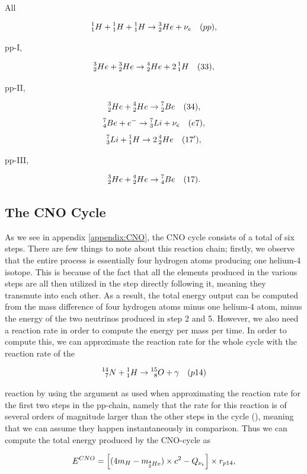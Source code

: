 \documentclass[a4paper,10pt,english]{article}
\newcommand{\Hh}{\prescript{1}{1}{H}}
\newcommand{\He}{\prescript{3}{2}{He}}
\begin{document}
All

$$\prescript{1}{1}{H} + \prescript{1}{1}{H} + \prescript{1}{1}{H} \rightarrow \prescript{3}{2}{He} + \nu_e \quad (pp),$$

pp-I,

$$\He + \He \rightarrow \prescript{4}{2}{He} + 2 \Hh \quad (33),$$

pp-II,

$$\He + \prescript{4}{2}{He} \rightarrow \prescript{7}{2}{Be} \quad (34),$$
$$\prescript{7}{4}{Be} + e^- \rightarrow \prescript{7}{3}{Li} + \nu_e \quad (e7),$$
$$\prescript{7}{3}{Li} + \Hh \rightarrow 2\prescript{4}{2}{He} \quad (17'),$$

pp-III,

$$\He + \prescript{4}{2}{He} \rightarrow \prescript{7}{4}{Be} \quad (17).$$
 
\subsection{The CNO Cycle}

As we see in appendix \ref{appendix:CNO}, the CNO cycle consists of a total of six steps. There are few things to note about this reaction chain; firstly, we observe that the entire process is essentially four hydrogen atoms producing one helium-4 isotope. This is because of the fact that all the elements produced in the various steps are all then utilized in the step directly following it, meaning they transmute into each other. As a result, the total energy output can be computed from the mass difference of four hydrogen atoms minus one helium-4 atom, minus the energy of the two neutrinos produced in step 2 and 5. However, we also need a reaction rate in order to compute the energy per mass per time. In order to compute this, we can approximate the reaction rate for the whole cycle with the reaction rate of the

$$\prescript{14}{7}{N} + \prescript{1}{1}{H} \rightarrow \prescript{15}{8}{O} + \gamma \quad (p14)$$

reaction by using the argument as used when approximating the reaction rate for the first two steps in the pp-chain, namely that the rate for this reaction is of several orders of magnitude larger than the other steps in the cycle (\cite{Gudiksen2015}), meaning that we can assume they happen instantaneously in comparison. Thus we can compute the total energy produced by the CNO-cycle as

$$E^{CNO} = \left[(4m_H - m_{\prescript{4}{2}{He}})\times c^2 - Q_{\nu_e}\right] \times r_{p14},$$
\end{document}
